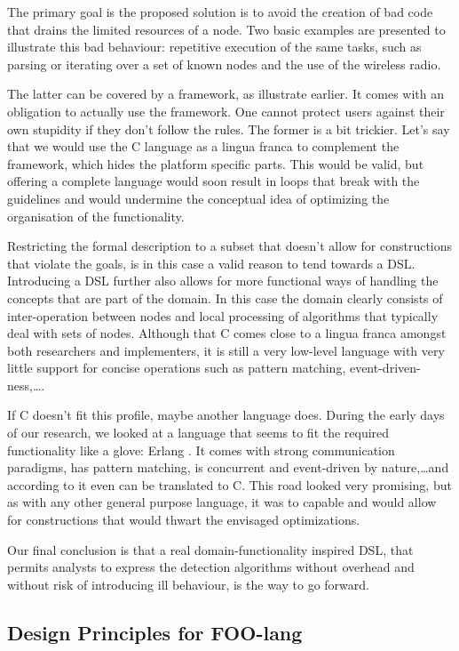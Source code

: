 \documentclass[conference]{IEEEtran}
\begin{document}
The primary goal is the proposed solution is to avoid the creation of bad code
that drains the limited resources of a node. Two basic examples are presented
to illustrate this bad behaviour: repetitive execution of the same tasks, such
as parsing or iterating over a set of known nodes and the use of the wireless
radio.

The latter can be covered by a framework, as illustrate earlier. It comes with
an obligation to actually use the framework. One cannot protect users against
their own stupidity if they don't follow the rules. The former is a bit
trickier. Let's say that we would use the C language as a lingua franca to
complement the framework, which hides the platform specific parts. This would
be valid, but offering a complete language would soon result in loops that
break with the guidelines and would undermine the conceptual idea of optimizing
the organisation of the functionality.

Restricting the formal description to a subset that doesn't allow for
constructions that violate the goals, is in this case a valid reason to tend
towards a DSL. Introducing a DSL further also allows for more functional ways
of handling the concepts that are part of the domain. In this case the domain
clearly consists of inter-operation between nodes and local processing of
algorithms that typically deal with sets of nodes. Although that C comes close
to a lingua franca amongst both researchers and implementers, it is still a
very low-level language with very little support for concise operations such as
pattern matching, event-driven-ness,\dots.

If C doesn't fit this profile, maybe another language does. During the early
days of our research, we looked at a language that seems to fit the required
functionality like a glove: Erlang \cite{armstrong1993concurrent}. It comes
with strong communication paradigms, has pattern matching, is concurrent and
event-driven by nature,\dots and according to \cite{wong1998compiling} it even
can be translated to C. This road looked very promising, but as with any other
general purpose language, it was to capable and would allow for constructions
that would thwart the envisaged optimizations.

Our final conclusion is that a real domain-functionality inspired DSL, that
permits analysts to express the detection algorithms without overhead and
without risk of introducing ill behaviour, is the way to go forward.

\subsection{Design Principles for FOO-lang}
\label{subsection:design}
\end{document}

